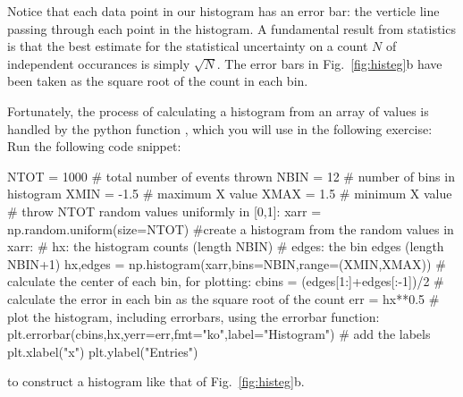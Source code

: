 {Notice that each data point in our histogram has an error bar: the
verticle line passing through each point in the histogram.  A
fundamental result from statistics is that the best estimate for the
statistical uncertainty on a count $N$ of independent occurances is
simply $\sqrt{N}$.  The error bars in Fig.~\ref{fig:histeg}b have been
taken as the square root of the count in each bin.

Fortunately, the process of calculating a histogram from an array of values is handled by the python function , which you will use in the following exercise:\\

\plot Run the following code snippet:
\begin{python}
NTOT = 1000  # total number of events thrown
NBIN = 12    # number of bins in histogram
XMIN = -1.5  # maximum X value
XMAX = 1.5   # minimum X value
# throw NTOT random values uniformly in [0,1]:
xarr = np.random.uniform(size=NTOT)
#create a histogram from the random values in xarr:
# hx:   the histogram counts (length NBIN)
# edges: the bin edges (length NBIN+1)
hx,edges = np.histogram(xarr,bins=NBIN,range=(XMIN,XMAX))
# calculate the center of each bin, for plotting:
cbins = (edges[1:]+edges[:-1])/2
# calculate the error in each bin as the square root of the count
err   = hx**0.5
# plot the histogram, including errorbars, using the errorbar function:
plt.errorbar(cbins,hx,yerr=err,fmt="ko",label="Histogram")
# add the labels
plt.xlabel("x")
plt.ylabel("Entries")
\end{python}
to construct a histogram like that of Fig.~\ref{fig:histeg}b.\\

}
